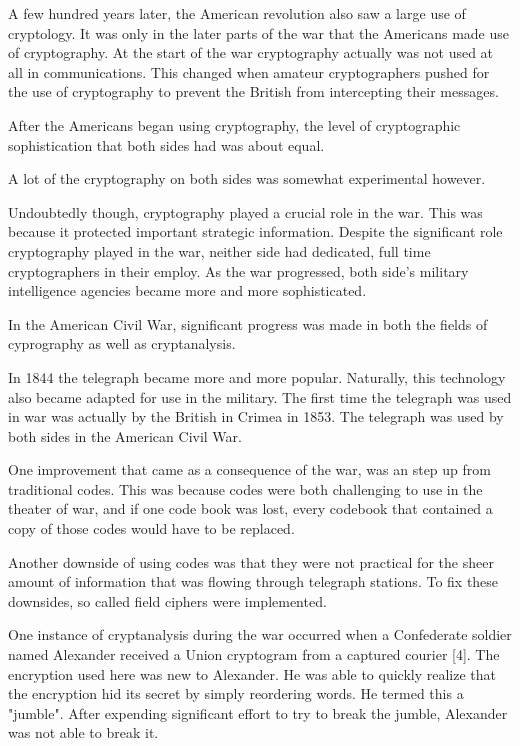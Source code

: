 \documentclass{article}
\begin{document}
    A few hundred years later, the American revolution also saw a large
    use of cryptology. It was only in the later parts of the war
    that the Americans made use of cryptography.
    At the start of the war cryptography actually was not used at all
    in communications. This changed when amateur cryptographers
     pushed for the use of cryptography to prevent the British
    from intercepting their messages.

    After the Americans began using cryptography, the level of
    cryptographic sophistication that both sides had was about equal.

    A lot of the cryptography on both sides was somewhat experimental however.

    Undoubtedly though, cryptography played a crucial role in the war.
    This was because it protected important strategic information.
    Despite the significant role cryptography played in the war,
    neither side had dedicated, full time cryptographers in their employ.
    As the war progressed, both side's military intelligence agencies
    became more and more sophisticated.

    In the American Civil War, significant progress was made in
    both the fields of cyprography as well as cryptanalysis.

    In 1844 the telegraph became more and more popular. Naturally,
    this technology also became adapted for use in the military.
    The first time the telegraph was used in war was actually by
    the British in Crimea in 1853.
    The telegraph was used by both sides in the American Civil War.

    One improvement that came as a consequence of the war,
    was an step up from traditional codes. This was because
    codes were both challenging to use in the theater of war,
    and if one code book was lost, every codebook that contained
    a copy of those codes would have to be replaced.

    Another downside of using codes was that they were not practical for
    the sheer amount of information that was flowing through telegraph
    stations.
    To fix these downsides, so called field ciphers were implemented.

    One instance of cryptanalysis during the war occurred when a
    Confederate soldier named Alexander received a Union cryptogram
    from a captured courier [4].
    The encryption used here was new to Alexander. He was able
    to quickly realize that the encryption hid its secret by simply
    reordering words. He termed this a "jumble". After expending significant
    effort to try to break the jumble, Alexander was not able to break it.
\end{document}
